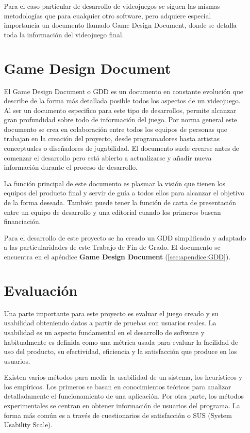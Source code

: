 Para el caso particular de desarrollo de videojuegos se siguen las mismas metodologías que para cualquier otro software, pero adquiere especial importancia un documento llamado Game Design Document, donde se detalla toda la información del videojuego final.

\section{Game Design Document}

El Game Design Document o GDD es un documento en constante evolución que describe de la forma más detallada posible todos los aspectos de un videojuego. Al ser un documento especifico para este tipo de desarrollos, permite alcanzar gran profundidad sobre todo de información del juego.  Por norma general este documento se crea en colaboración entre todos los equipos de personas que trabajan en la creación del proyecto, desde programadores hasta artistas conceptuales o diseñadores de jugabilidad. El documento suele crearse antes de comenzar el desarrollo pero está abierto a actualizarse y añadir nueva información durante el proceso de desarrollo.

La función principal de este documento es plasmar la visión que tienen los equipos del producto final y servir de guía a todos ellos para alcanzar el objetivo de la forma deseada. También puede tener la función de carta de presentación entre un equipo de desarrollo y una editorial cuando los primeros buscan financiación.

Para el desarrollo de este proyecto se ha creado un GDD simplificado y adaptado a las particularidades de este Trabajo de Fin de Grado. El documento se encuentra en el apéndice \textbf{Game Design Document} (\ref{sec:apendice:GDD}).

\section{Evaluación}
\label{sec:evaluacion}

Una parte importante para este proyecto es evaluar el juego creado y su usabilidad obteniendo datos a partir de pruebas con usuarios reales. La usabilidad es un aspecto fundamental en el desarrollo de software y habitualmente es definida como una métrica usada para evaluar la facilidad de uso del producto, su efectividad, eficiencia y la satisfacción que produce en los usuarios. \cite{MU_eval_usabilidad}

Existen varios métodos para medir la usabilidad de un sistema, los heurísticos y los empíricos. Los primeros se basan en conocimientos teóricos para analizar detalladamente el funcionamiento de una aplicación. Por otra parte, los métodos experimentales se centran en obtener información de usuarios del programa. La forma más común es a través de cuestionarios de satisfacción o SUS (System Usability Scale).


